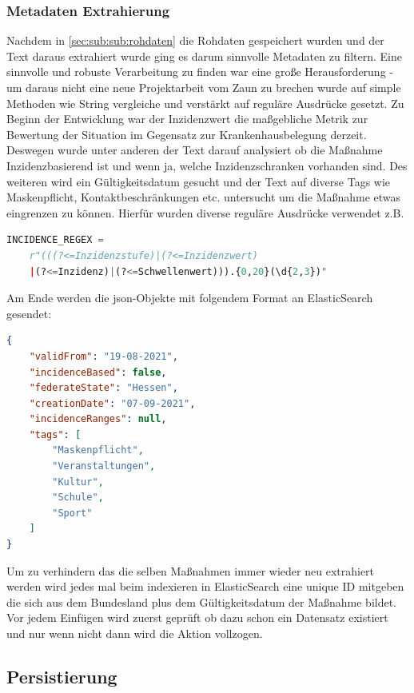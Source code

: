 \documentclass[12pt,oneside,a4paper,parskip]{scrbook}
\begin{document}
\subsubsection{Metadaten Extrahierung}

Nachdem in \cref{sec:sub:sub:rohdaten} die Rohdaten gespeichert wurden und der Text daraus extrahiert wurde ging es darum sinnvolle Metadaten zu filtern. Eine sinnvolle und robuste Verarbeitung zu finden war eine große Herausforderung - um daraus nicht eine neue Projektarbeit vom Zaun zu brechen wurde auf simple Methoden wie String vergleiche und verstärkt auf reguläre Ausdrücke gesetzt. Zu Beginn der Entwicklung war der Inzidenzwert die maßgebliche Metrik zur Bewertung der Situation im Gegensatz zur Krankenhausbelegung derzeit. Deswegen wurde unter anderen der Text darauf analysiert ob die Maßnahme Inzidenzbasierend ist und wenn ja, welche Inzidenzschranken vorhanden sind. Des weiteren wird ein Gültigkeitsdatum gesucht und der Text auf diverse Tags wie Maskenpflicht, Kontaktbeschränkungen etc. untersucht um die Maßnahme etwas eingrenzen zu können. Hierfür wurden diverse reguläre Ausdrücke verwendet z.B.

\begin{lstlisting}[caption=Regex für Inzidenzschranken, language=Python]
INCIDENCE_REGEX =
	r"(((?<=Inzidenzstufe)|(?<=Inzidenzwert)
	|(?<=Inzidenz)|(?<=Schwellenwert))).{0,20}(\d{2,3})"
\end{lstlisting}

Am Ende werden die json-Objekte mit folgendem Format an ElasticSearch gesendet:

\begin{lstlisting}[caption=Metadaten-Objekt, language=json]
{
	"validFrom": "19-08-2021",
	"incidenceBased": false,
	"federateState": "Hessen",
	"creationDate": "07-09-2021",
	"incidenceRanges": null,
	"tags": [
		"Maskenpflicht",
		"Veranstaltungen",
		"Kultur",
		"Schule",
		"Sport"
	]
}
\end{lstlisting}

Um zu verhindern das die selben Maßnahmen immer wieder neu extrahiert werden wird jedes mal beim indexieren in ElasticSearch eine unique ID mitgeben die sich aus dem Bundesland plus dem Gültigkeitsdatum der Maßnahme bildet. Vor jedem Einfügen wird zuerst geprüft ob dazu schon ein Datensatz existiert und nur wenn nicht dann wird die Aktion vollzogen.

\subsection{Persistierung}
\end{document}
